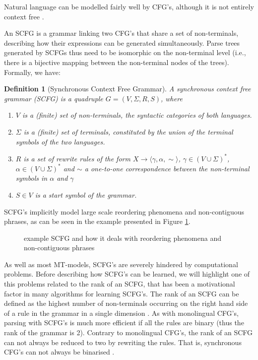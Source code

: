 \documentclass{report}
\theoremstyle{definition}
\theoremstyle{plain}
\newtheorem{definition}{Definition}
\begin{document}
Natural language can be modelled fairly well by CFG's, although it is not entirely context free \citep[e.g.,][]{shieber1987evidence}.

An SCFG \citep{aho1969properties} is a grammar linking two CFG's that share a set of non-terminals, describing how their expressions can be generated simultaneously. Parse trees generated by SCFGs thus need to be isomorphic on the non-terminal level (i.e., there is a bijective mapping between the non-terminal nodes of the trees). Formally, we have:

\begin{definition}[Synchronous Context Free Grammar]
A synchronous context free grammar (SCFG) is a quadruple $G = (V, \Sigma, R, S)$, where\begin{enumerate}
\item $V$ is a (finite) set of non-terminals, the syntactic categories of both languages.
\item $\Sigma$ is a (finite) set of terminals, constituted by the union of the terminal symbols of the two languages.
\item $R$ is a set of rewrite rules of the form $X\rightarrow\langle\gamma,\alpha,\sim\rangle$, $\gamma\in (V\cup\Sigma)^{*}$,  $\alpha\in (V\cup\Sigma)^{*}$ and $\sim$ a one-to-one correspondence between the non-terminal symbols in $\alpha$ and $\gamma$
\item $S\in V$ is a start symbol of the grammar.
\end{enumerate}
\end{definition}

SCFG's implicitly model large scale reordering phenomena and non-contiguous phrases, as can be seen in the example presented in Figure \ref{fig:scfg}.

\begin{figure}[!ht]
\caption{example SCFG and how it deals with reordering phenomena and non-contiguous phrases}\label{fig:scfg}
\end{figure}

As well as most MT-models, SCFG's are severely hindered by computational problems. Before describing how SCFG's can be learned, we will highlight one of this problems related to the rank of an SCFG, that has been a motivational factor in many algorithms for learning SCFG's. The rank of an SCFG can be defined as the highest number of non-terminals occurring on the right hand side of a rule in the grammar in a single dimension \citep{gildea2006factoring}. As with monolingual CFG's, parsing with SCFG's is much more efficient if all the rules are binary (thus the rank of the grammar is 2). Contrary to monolingual CFG's, the rank of an SCFG can not always be reduced to two by rewriting the rules. That is, synchronous CFG's can not always be binarised \citep{huang2009binarization}. 
\end{document}
